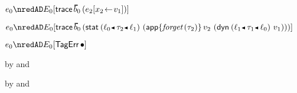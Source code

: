 {\begin{lamportproof*}
    \begin{pfproof}
        \begin{pfproof}
          \qedstep
            \begin{pfproof}
              $\sexpr_0 \nredAD \ctx_0[\eprehist{\sblist_0}{(\esubst{\sexpr_2}{\svar_2}{\svalue_1})}]$
            \end{pfproof}
        \end{pfproof}
        \begin{pfproof}
          \qedstep
            \begin{pfproof}
              $\sexpr_0 \nredAD \ctx_0[\eprehist{\sblist_0}{(\estab{\obnd{\sowner_0}{\stype_2}{\sowner_1}}{(\eapp{\fforget{\stype_2}}{\svalue_2}{(\edynb{\obnd{\sowner_1}{\stype_1}{\sowner_0}}{\svalue_1})})})}]$
            \end{pfproof}
        \end{pfproof}
        \begin{pfproof}
          \qedstep
            \begin{pfproof}
              $\sexpr_0 \nredAD \ctx_0[\tagerrorD]$
            \end{pfproof}
        \end{pfproof}
    \end{pfproof}

    \begin{pfproof}
      \qedstep
        \begin{pfproof}
          by  and 
        \end{pfproof}
    \end{pfproof}

    \begin{pfproof}
      \qedstep
        \begin{pfproof}
          by  and 
        \end{pfproof}
    \end{pfproof}


\end{lamportproof*}}
